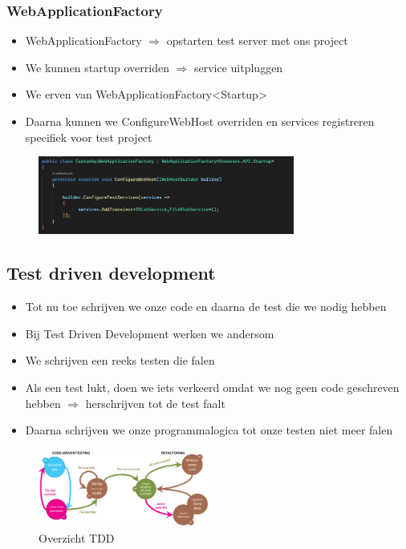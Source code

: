 \documentclass{article}
\begin{document}
\subsubsection{WebApplicationFactory}

\begin{itemize}
    \item WebApplicationFactory $\Rightarrow$ opstarten test server met ons project
    \item We kunnen startup overriden $\Rightarrow$ service uitpluggen
    \item We erven van WebApplicationFactory<Startup>
    \item Daarna kunnen we ConfigureWebHost overriden en services registreren specifiek voor test project
\end{itemize}

\begin{figure}[H]
    \centering
    \includegraphics[width=0.75\textwidth]{integration-test5.png}
\end{figure}

\subsection{Test driven development}

\begin{itemize}
    \item Tot nu toe schrijven we onze code en daarna de test die we nodig hebben
    \item Bij Test Driven Development werken we andersom
    \item We schrijven een reeks testen die falen
    \item Als een test lukt, doen we iets verkeerd omdat we nog geen code geschreven hebben $\Rightarrow$ herschrijven tot de test faalt
    \item Daarna schrijven we onze programmalogica tot onze testen niet meer falen
\end{itemize}

\begin{figure}[H]
    \centering
    \includegraphics[width=0.5\textwidth]{test-driven-development.png}
    \caption{Overzicht TDD}
\end{figure}
\end{document}

